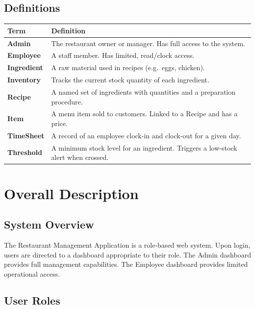 \documentclass[12pt]{article}
\newcommand{\headerrow}{\rowcolor{darkblue}\color{white}\bfseries}
\begin{document}
\subsection{Definitions}

\begin{tabularx}{\textwidth}{>{\bfseries}p{2cm} X}
\toprule
\headerrow Term & Definition \\
\midrule
\rowcolor{lightgray} Admin       & The restaurant owner or manager. Has full access to the system. \\
Employee    & A staff member. Has limited, read/clock access. \\
\rowcolor{lightgray} Ingredient  & A raw material used in recipes (e.g.\ eggs, chicken). \\
Inventory   & Tracks the current stock quantity of each ingredient. \\
\rowcolor{lightgray} Recipe      & A named set of ingredients with quantities and a preparation procedure. \\
Item        & A menu item sold to customers. Linked to a Recipe and has a price. \\
\rowcolor{lightgray} TimeSheet   & A record of an employee clock-in and clock-out for a given day. \\
Threshold   & A minimum stock level for an ingredient. Triggers a low-stock alert when crossed. \\
\bottomrule
\end{tabularx}

\newpage

\section{Overall Description}

\subsection{System Overview}
The Restaurant Management Application is a role-based web system. Upon login, users are
directed to a dashboard appropriate to their role. The Admin dashboard provides full
management capabilities. The Employee dashboard provides limited operational access.

\subsection{User Roles}
\end{document}
